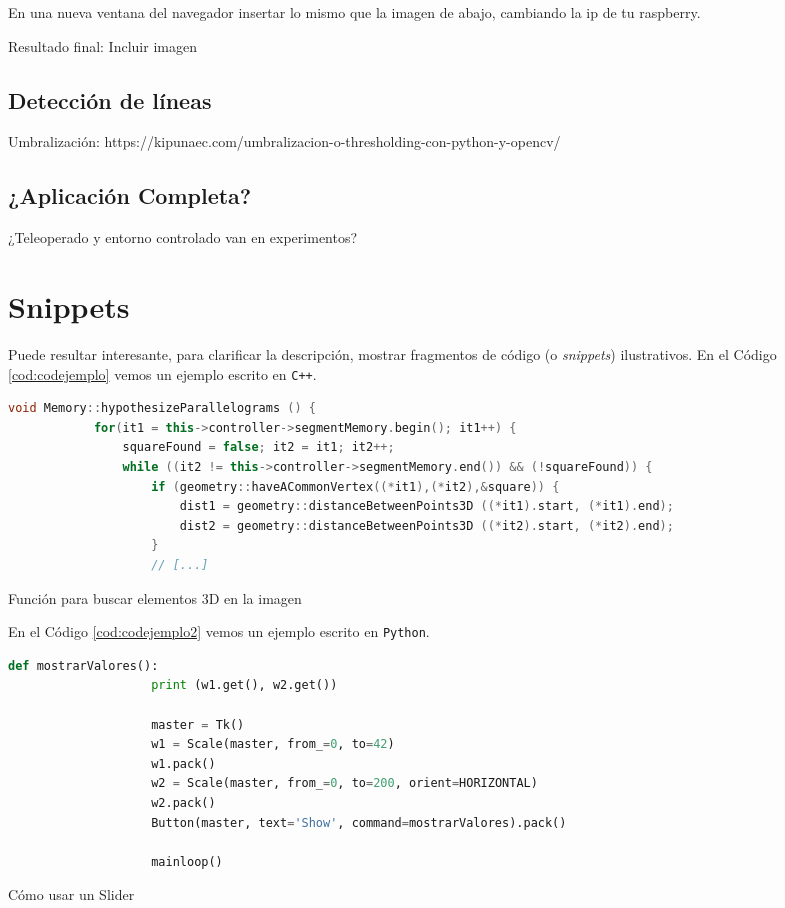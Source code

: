 En una nueva ventana del navegador insertar lo mismo que la imagen de abajo, cambiando la ip de tu raspberry.

Resultado final: Incluir imagen


\subsection{Detección de líneas}
\label{subsec:softwaredl}

Umbralización:  https://kipunaec.com/umbralizacion-o-thresholding-con-python-y-opencv/

\subsection{¿Aplicación Completa?}


¿Teleoperado y entorno controlado van en experimentos?



\section{Snippets}

Puede resultar interesante, para clarificar la descripción, mostrar fragmentos de código (o \textit{snippets}) ilustrativos. En el Código \ref{cod:codejemplo} vemos un ejemplo escrito en \texttt{C++}.

\begin{code}[h]
	\begin{lstlisting}[language=C++]
		void Memory::hypothesizeParallelograms () {
			for(it1 = this->controller->segmentMemory.begin(); it1++) {
				squareFound = false; it2 = it1; it2++;
				while ((it2 != this->controller->segmentMemory.end()) && (!squareFound)) {
					if (geometry::haveACommonVertex((*it1),(*it2),&square)) {
						dist1 = geometry::distanceBetweenPoints3D ((*it1).start, (*it1).end);
						dist2 = geometry::distanceBetweenPoints3D ((*it2).start, (*it2).end);
					}
					// [...]
				\end{lstlisting}
				\caption[Función para buscar elementos 3D en la imagen]{Función para buscar elementos 3D en la imagen}
				\label{cod:codejemplo}
			\end{code}
			
			En el Código \ref{cod:codejemplo2} vemos un ejemplo escrito en \texttt{Python}.
			
			\begin{code}[h]
				\begin{lstlisting}[language=Python]
					def mostrarValores():
					print (w1.get(), w2.get())
					
					master = Tk()
					w1 = Scale(master, from_=0, to=42)
					w1.pack()
					w2 = Scale(master, from_=0, to=200, orient=HORIZONTAL)
					w2.pack()
					Button(master, text='Show', command=mostrarValores).pack()
					
					mainloop()
				\end{lstlisting}
				\caption[Cómo usar un Slider]{Cómo usar un Slider}
				\label{cod:codejemplo2}
			\end{code}
			
